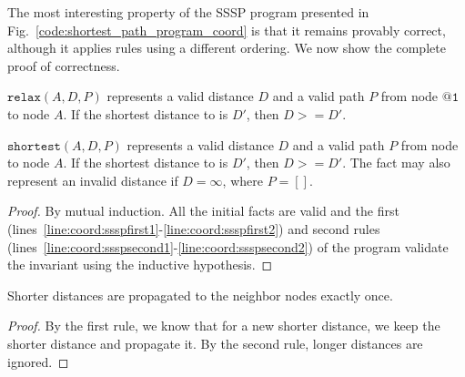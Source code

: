 The most interesting property of the SSSP program presented in
Fig.~\ref{code:shortest_path_program_coord} is that it remains provably correct,
although it applies rules using a different ordering. We now show the complete
proof of correctness.

\begin{invariant}[Distance]

   $\mathtt{relax}(A, D, P)$ represents a valid distance $D$ and a valid path
   $P$ from node $\mathtt{@1}$ to node $A$. If the shortest distance to
 is $D'$, then $D >= D'$.

$\mathtt{shortest}(A, D, P)$ represents a valid distance $D$ and a valid
path $P$ from node  to node $A$. If the shortest
distance to  is $D'$, then $D >= D'$. The  fact may
also represent an invalid distance if $D = \infty$, where $P = []$.

\end{invariant}

\begin{proof}

By mutual induction. All the initial facts are valid and the first
(lines~\ref{line:coord:ssspfirst1}-\ref{line:coord:ssspfirst2}) and second rules
(lines~\ref{line:coord:ssspsecond1}-\ref{line:coord:ssspsecond2}) of the program
validate the invariant using the inductive hypothesis.

\end{proof}

\begin{lemma}[Relaxation]
Shorter distances are propagated to the neighbor nodes exactly once.
\end{lemma}

\begin{proof}
By the first rule, we know that for a new shorter distance, we keep the shorter
distance and propagate it. By the second rule, longer distances are ignored.
\end{proof}

